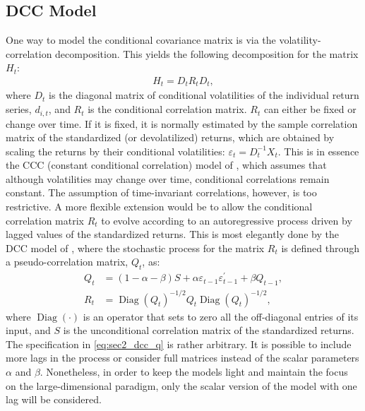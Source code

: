 \subsection{DCC Model}
One way to model the conditional covariance matrix is via the volatility-correlation decomposition. This yields the following decomposition for the matrix $H_t$:
\begin{align}
	H_t = D_t R_t D_t, \label{eq:sec2_vol-corr-decomp}
\end{align}
where $D_t$ is the diagonal matrix of conditional volatilities of the individual return series, $d_{i,t}$, and $R_t$ is the conditional correlation matrix. $R_t$ can either be fixed or change over time. If it is fixed, it is normally estimated by the sample correlation matrix of the standardized (or devolatilized) returns, which are obtained by scaling the returns by their conditional volatilities: $\varepsilon_{t} = D_t^{-1}X_t$. This is in essence the CCC (constant conditional correlation) model of \textcite{BOLLERSLEV1990}, which assumes that although volatilities may change over time, conditional correlations remain constant. The assumption of time-invariant correlations, however, is too restrictive. A more flexible extension would be to allow the conditional correlation matrix $R_t$ to evolve according to an autoregressive process driven by lagged values of the standardized returns. This is most elegantly done by the DCC model of \textcite{ENGLE2002}, where the stochastic process for the matrix $R_t$ is defined through a pseudo-correlation matrix, $Q_t$, as:
\begin{align}
	Q_t &= (1 - \alpha - \beta) S + \alpha \varepsilon_{t-1} \varepsilon_{t-1}^\prime + \beta Q_{t-1}, \label{eq:sec2_dcc_q} \\
	R_t &= \operatorname{Diag}(Q_t)^{-1/2} Q_t \operatorname{Diag}(Q_t)^{-1/2}, \label{eq:sec2_dcc_r}
\end{align}
where $\operatorname{Diag}(\cdot)$ is an operator that sets to zero all the off-diagonal entries of its input, and $S$ is the unconditional correlation matrix of the standardized returns. The specification in \eqref{eq:sec2_dcc_q} is rather arbitrary. It is possible to include more lags in the process or consider full matrices instead of the scalar parameters $\alpha$ and $\beta$. Nonetheless, in order to keep the models light and maintain the focus on the large-dimensional paradigm, only the scalar version of the model with one lag will be considered. 

